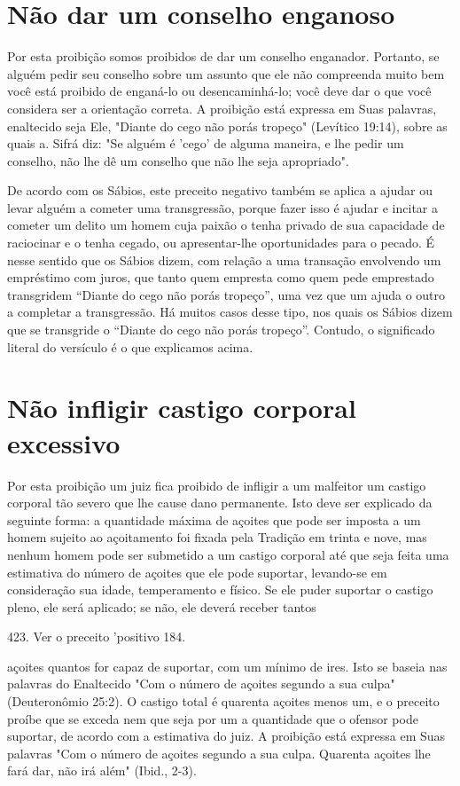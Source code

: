 \section{Não dar um conselho enganoso}

Por esta proibição somos proibidos de dar um conselho enganador.
Portanto, se alguém pedir seu conselho sobre um assunto que ele não
com­preenda muito bem você está proibido de enganá-lo ou
desencaminhá-lo; você deve dar o que você considera ser a orientação
correta. A proibição está ex­pressa em Suas palavras, enaltecido seja
Ele, "Diante do cego não porás trope­ço" (Levítico 19:14), sobre as
quais a. Sifrá diz: "Se alguém é 'cego' de alguma maneira, e lhe pedir
um conselho, não lhe dê um conselho que não lhe seja apropriado".

De acordo com os Sábios, este preceito negativo também se aplica a
ajudar ou levar alguém a cometer uma transgressão, porque fazer isso é
ajudar e incitar a cometer um delito um homem cuja paixão o tenha
privado de sua capacidade de raciocinar e o tenha cegado, ou
apresentar-lhe oportunidades para o pecado. É nesse sentido que os
Sábios dizem, com relação a uma transa­ção envolvendo um empréstimo com
juros, que tanto quem empresta como quem pede emprestado transgridem
``Diante do cego não porás tropeço'', uma vez que um ajuda o outro a
completar a transgressão. Há muitos casos desse tipo, nos quais os
Sábios dizem que se transgride o ``Diante do cego não porás tropeço''.
Contudo, o significado literal do versículo é o que explicamos acima.

\section{Não infligir castigo corporal excessivo}

Por esta proibição um juiz fica proibido de infligir a um malfeitor um
castigo corporal tão severo que lhe cause dano permanente. Isto deve ser
explicado da seguinte forma: a quantidade máxima de açoites que pode ser
im­posta a um homem sujeito ao açoitamento foi fixada pela Tradição em
trinta e nove, mas nenhum homem pode ser submetido a um castigo corporal
até que seja feita uma estimativa do número de açoites que ele pode
suportar, levando-se em consideração sua idade, temperamento e físico.
Se ele puder su­portar o castigo pleno, ele será aplicado; se não, ele
deverá receber tantos

423. Ver o preceito 'positivo 184.

açoites quantos for capaz de suportar, com um mínimo de ires. Isto se
baseia nas palavras do Enaltecido "Com o número de açoites segundo a sua
culpa" (Deuteronômio 25:2). O castigo total é quarenta açoites menos um,
e o precei­to proíbe que se exceda nem que seja por um a quantidade que
o ofensor pode suportar, de acordo com a estimativa do juiz. A proibição
está expressa em Suas palavras "Com o número de açoites segundo a sua
culpa. Quarenta açoites lhe fará dar, não irá além" (Ibid., 2-3).

